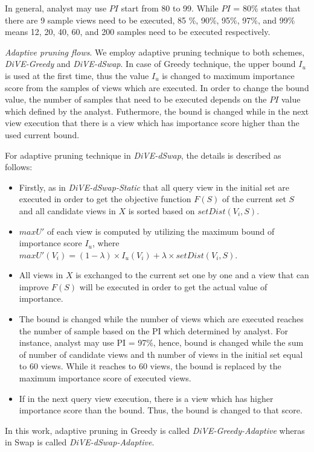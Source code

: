 {In general, analyst may use $ PI $ start from 80 to 99. While $ PI $ = 80\% states that there are 9 sample views need to be executed, 85 \%, 90\%, 95\%, 97\%, and 99\% means 12, 20, 40, 60, and 200 samples need to be executed respectively. 

\textit{Adaptive pruning flows}. We employ adaptive pruning technique to both schemes, \textit{DiVE-Greedy} and \textit{DiVE-dSwap}. In case of Greedy technique, the upper bound $I_u$ is used at the first time, thus the value $I_u$ is changed to maximum importance score from the samples of views which are executed. In order to change the bound value, the number of samples that need to be executed depends on the $ PI $ value which defined by the analyst. Futhermore, the bound is changed while in the next view execution that there is a view which has importance score higher than the used current bound.

For adaptive pruning technique in \textit{DiVE-dSwap}, the details is described as follows:

\begin{itemize}
	\item Firstly, as in \textit{ DiVE-dSwap-Static} that all query view in the initial set are executed in order to get the objective function $F(S)$ of the current set $S$ and all candidate views in $X$ is sorted based on $ setDist\left(V_i, S\right)  $.
	\item $ maxU' $ of each view is computed by utilizing the maximum bound of importance score $I_u$, where $ maxU'\left(V_i\right)= \left(1-\lambda\right) \times I_u\left(V_i\right) + \lambda \times setDist\left(V_i, S\right) $. 
	\item All views in $X$ is exchanged to the current set one by one and a view that can improve $F(S)$ will be executed in order to get the actual value of importance. 
	\item The bound is changed while the number of views which are executed reaches the number of sample based on the PI which determined by analyst. For instance, analyst may use PI = 97\%, hence, bound is changed while the sum of number of candidate views and th number of views in the initial set equal to 60 views. While it reaches to 60 views, the bound is replaced by the maximum importance score of executed views.  
	\item If in the next query view execution, there is a view which has higher importance score than the bound. Thus, the bound is changed to that score. 
\end{itemize}


In this work, adaptive pruning in Greedy is called \textit{DiVE-Greedy-Adaptive} wheras in Swap is called \textit{DiVE-dSwap-Adaptive}.
}
